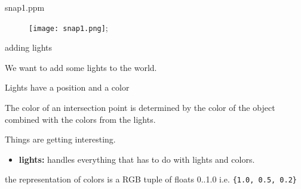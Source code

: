 \begin{frame}{snap1.ppm}

\begin{figure}
\texttt{[image: snap1.png]};
\end{figure}

\end{frame}


\begin{frame}[fragile]{adding lights}

\pause We want to add some lights to the world.

\pause 
\vspace{10pt}Lights have a position and a color

\pause \vspace{10pt}The color of an intersection point is determined
by the color of the object combined with the colors from the lights.

\pause 
\vspace{10pt}Things are getting interesting.

\begin{itemize}
\item {\bf lights:} handles everything that has to do with lights and colors.
\end{itemize}

\pause \vspace{20pt}
the representation of colors is a RGB tuple of floats 0..1.0 i.e. \verb+{1.0, 0.5, 0.2}+

\end{frame}


